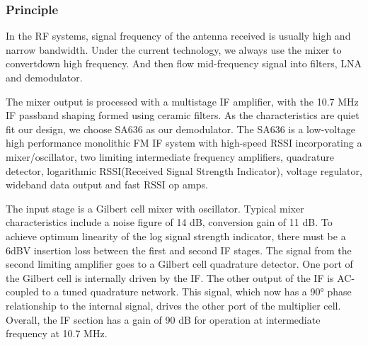 \documentclass[]{article}
\begin{document}
        \subsubsection{Principle}
            In the RF systems, signal frequency of the antenna received is
            usually high and narrow bandwidth. Under the current technology, we
            always use the mixer to convertdown high frequency. And then flow
            mid-frequency signal into filters, LNA and demodulator.\par
            The mixer output is processed with a multistage IF amplifier, with
            the 10.7 MHz IF passband shaping formed using ceramic filters. As
            the characteristics are quiet fit our design, we choose SA636 as our
            demodulator. The SA636 is a low-voltage high performance monolithic
            FM IF system with high-speed RSSI incorporating a mixer/oscillator,
            two limiting intermediate frequency amplifiers, quadrature detector,
            logarithmic RSSI(Received Signal Strength Indicator), voltage
            regulator, wideband data output and fast RSSI op amps. \par
            The input stage is a Gilbert cell mixer with oscillator. Typical
            mixer characteristics include a noise figure of 14 dB, conversion
            gain of 11 dB. To achieve optimum linearity of the log signal
            strength indicator, there must be a 6dBV insertion loss between the
            first and second IF stages. The signal from the second limiting
            amplifier goes to a Gilbert cell quadrature detector. One port of
            the Gilbert cell is internally driven by the IF. The other output of
            the IF is AC-coupled to a tuned quadrature network. This signal,
            which now has a 90° phase relationship to the internal signal,
            drives the other port of the multiplier cell. Overall, the IF
            section has a gain of 90 dB for operation at intermediate frequency
            at 10.7 MHz. \par
\end{document}
